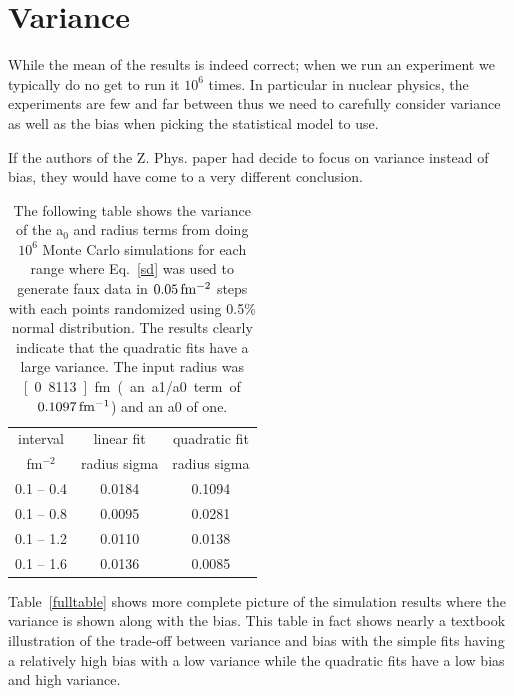\documentclass[10pt,aps,prc,twocolumn]{revtex4-1}
\begin{document}
\section{Variance}

While the mean of the results is indeed correct; when we run an experiment we typically do no get to run it $10^6$ times.
In particular in nuclear physics, the experiments are few and far between thus we need to carefully consider variance as
well as the bias when picking the statistical model to use.

If the authors of the Z. Phys. paper had decide to focus on variance instead of bias, they would have come to a very
different conclusion.

\begin{table}
\label{ztable}
\caption{The following table shows the variance of the a$_0$ and radius terms from doing $10^6$ Monte Carlo simulations
for each range
where Eq.~\ref{sd} was used to generate faux data in $\unit[0.05]{fm^{-2}}$ steps with each points randomized using
0.5\% normal distribution.   The results clearly indicate that the quadratic fits have a large variance.   The input
radius was \unit[0.8113]{fm} (an a1/a0 term of $\unit[0.1097]{fm^{-1}}$) and an a0 of one.}
\begin{tabular}{c|c|c} \hline
interval       & \multicolumn{1}{c|}{linear fit} & \multicolumn{1}{c}{quadratic fit}  \\
fm$^{-2}$   & radius sigma         &  radius sigma \\ \hline
 0.1 -- 0.4 & 0.0184&  0.1094 \\
 0.1 -- 0.8 & 0.0095&  0.0281 \\
 0.1 -- 1.2 & 0.0110&  0.0138 \\
 0.1 -- 1.6 & 0.0136&  0.0085 \\ \hline
\end{tabular}
\end{table}


Table~\ref{fulltable} shows more complete picture of the simulation results where the variance is shown along with the bias.
This table in fact shows nearly a textbook illustration of the trade-off between variance and bias with the simple fits
having a relatively high bias with a low variance while the quadratic fits have a low bias and high variance.
\end{document}
